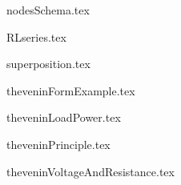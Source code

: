 \begin{frame}{nodesSchema.tex}
\begin{center}

\end{center}
\end{frame}

\begin{frame}{RLseries.tex}
\begin{center}

\end{center}
\end{frame}

\begin{frame}{superposition.tex}
\begin{center}

\end{center}
\end{frame}

\begin{frame}{theveninFormExample.tex}
\begin{center}

\end{center}
\end{frame}

\begin{frame}{theveninLoadPower.tex}
\begin{center}

\end{center}
\end{frame}

\begin{frame}{theveninPrinciple.tex}
\begin{center}

\end{center}
\end{frame}

\begin{frame}{theveninVoltageAndResistance.tex}
\begin{center}

\end{center}
\end{frame}

